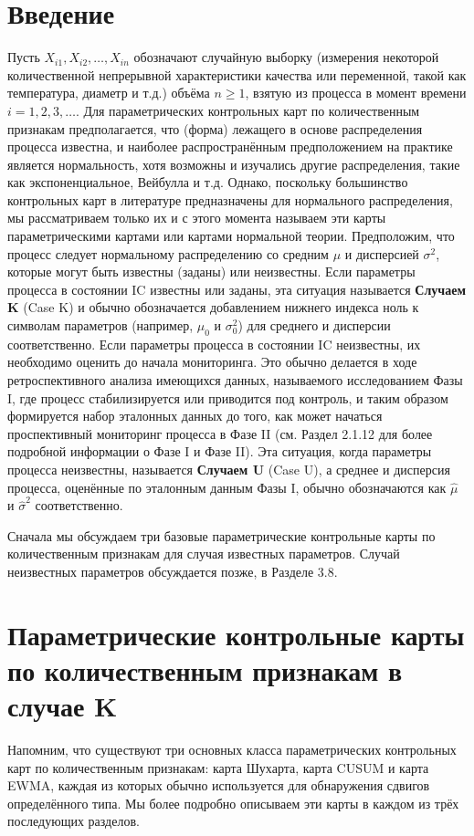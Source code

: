 \section{Введение}
Пусть \(X_{i1}, X_{i2}, \ldots, X_{in}\) обозначают случайную выборку (измерения некоторой количественной непрерывной характеристики качества или переменной, такой как температура, диаметр и т.д.) объёма \(n \geq 1\), взятую из процесса в момент времени \(i = 1, 2, 3, \ldots\). Для параметрических контрольных карт по количественным признакам предполагается, что (форма) лежащего в основе распределения процесса известна, и наиболее распространённым предположением на практике является нормальность, хотя возможны и изучались другие распределения, такие как экспоненциальное, Вейбулла и т.д. Однако, поскольку большинство контрольных карт в литературе предназначены для нормального распределения, мы рассматриваем только их и с этого момента называем эти карты параметрическими картами или картами нормальной теории. Предположим, что процесс следует нормальному распределению со средним \(\mu\) и дисперсией \(\sigma^2\), которые могут быть известны (заданы) или неизвестны. Если параметры процесса в состоянии IC известны или заданы, эта ситуация называется \textbf{Случаем K} (Case K) и обычно обозначается добавлением нижнего индекса ноль к символам параметров (например, \(\mu_0\) и \(\sigma_0^2\)) для среднего и дисперсии соответственно. Если параметры процесса в состоянии IC неизвестны, их необходимо оценить до начала мониторинга. Это обычно делается в ходе ретроспективного анализа имеющихся данных, называемого исследованием Фазы I, где процесс стабилизируется или приводится под контроль, и таким образом формируется набор эталонных данных до того, как может начаться проспективный мониторинг процесса в Фазе II (см. Раздел 2.1.12 для более подробной информации о Фазе I и Фазе II). Эта ситуация, когда параметры процесса неизвестны, называется \textbf{Случаем U} (Case U), а среднее и дисперсия процесса, оценённые по эталонным данным Фазы I, обычно обозначаются как \(\hat{\mu}\) и \(\hat{\sigma}^2\) соответственно.

Сначала мы обсуждаем три базовые параметрические контрольные карты по количественным признакам для случая известных параметров. Случай неизвестных параметров обсуждается позже, в Разделе 3.8.

\section{Параметрические контрольные карты по количественным признакам в случае K}
Напомним, что существуют три основных класса параметрических контрольных карт по количественным признакам: карта Шухарта, карта CUSUM и карта EWMA, каждая из которых обычно используется для обнаружения сдвигов определённого типа. Мы более подробно описываем эти карты в каждом из трёх последующих разделов.

